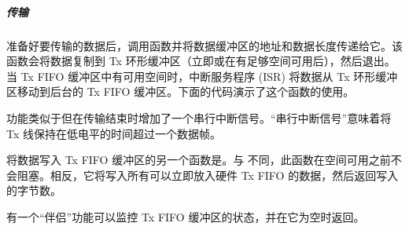 \documentclass[a4paper,12pt,english]{sphinxmanual}
\begin{document}
{{\subparagraph{传输}
\label{\detokenize{exp-esp32/peripherals/uart:id6}}
\sphinxAtStartPar
准备好要传输的数据后，调用函数并将数据缓冲区的地址和数据长度传递给它。该函数会将数据复制到 Tx 环形缓冲区（立即或在有足够空间可用后），然后退出。当 Tx FIFO 缓冲区中有可用空间时，中断服务程序 (ISR) 将数据从 Tx 环形缓冲区移动到后台的 Tx FIFO 缓冲区。下面的代码演示了这个函数的使用。

\begin{sphinxVerbatim}[commandchars=\\\{\}]
\end{sphinxVerbatim}

\sphinxAtStartPar
功能类似于但在传输结束时增加了一个串行中断信号。“串行中断信号”意味着将 Tx 线保持在低电平的时间超过一个数据帧。

\begin{sphinxVerbatim}[commandchars=\\\{\}]
\end{sphinxVerbatim}

\sphinxAtStartPar
将数据写入 Tx FIFO 缓冲区的另一个函数是。与 不同，此函数在空间可用之前不会阻塞。相反，它将写入所有可以立即放入硬件 Tx FIFO 的数据，然后返回写入的字节数。

\sphinxAtStartPar
有一个“伴侣”功能可以监控 Tx FIFO 缓冲区的状态，并在它为空时返回。

}}
\end{document}
